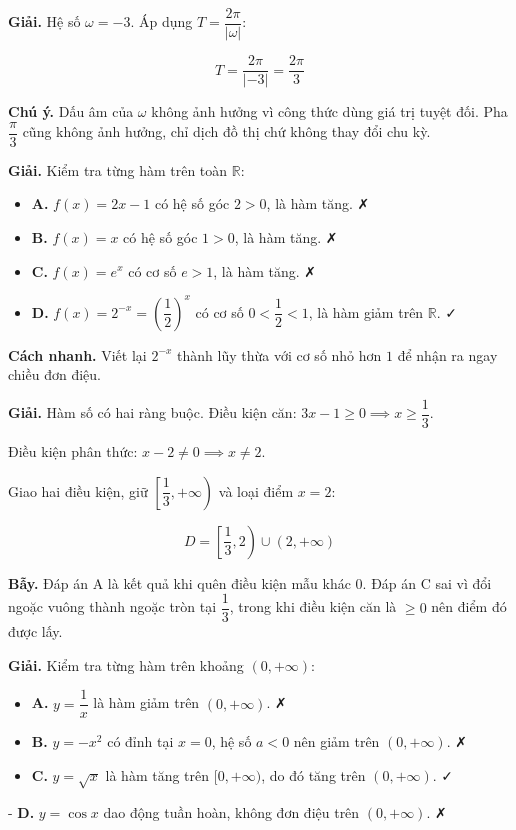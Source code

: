 \documentclass[11pt, a4paper]{article}
\begin{document}
\begin{dapan}[12 — Đáp án B]
\textbf{Giải.} Hệ số $\omega = -3$. Áp dụng $T = \dfrac{2\pi}{|\omega|}$:

$$T = \frac{2\pi}{|-3|} = \frac{2\pi}{3}$$

\textbf{Chú ý.} Dấu âm của $\omega$ không ảnh hưởng vì công thức dùng giá trị tuyệt đối. Pha $\dfrac{\pi}{3}$ cũng không ảnh hưởng, chỉ dịch đồ thị chứ không thay đổi chu kỳ.
\end{dapan}

\begin{dapan}[13 — Đáp án D]
\textbf{Giải.} Kiểm tra từng hàm trên toàn $\mathbb{R}$:

\begin{itemize}[leftmargin=1.4em, itemsep=2pt]
\item \textbf{A.} $f(x) = 2x - 1$ có hệ số góc $2 > 0$, là hàm tăng. ✗
\item \textbf{B.} $f(x) = x$ có hệ số góc $1 > 0$, là hàm tăng. ✗
\item \textbf{C.} $f(x) = e^x$ có cơ số $e > 1$, là hàm tăng. ✗
\item \textbf{D.} $f(x) = 2^{-x} = \left(\dfrac{1}{2}\right)^x$ có cơ số $0 < \dfrac{1}{2} < 1$, là hàm giảm trên $\mathbb{R}$. ✓
\end{itemize}


\textbf{Cách nhanh.} Viết lại $2^{-x}$ thành lũy thừa với cơ số nhỏ hơn $1$ để nhận ra ngay chiều đơn điệu.
\end{dapan}

\begin{dapan}[14 — Đáp án D]
\textbf{Giải.} Hàm số có hai ràng buộc. Điều kiện căn: $3x - 1 \ge 0 \implies x \ge \dfrac{1}{3}$.

Điều kiện phân thức: $x - 2 \neq 0 \implies x \neq 2$.

Giao hai điều kiện, giữ $\left[\dfrac{1}{3}, +\infty\right)$ và loại điểm $x = 2$:

$$D = \left[\dfrac{1}{3}, 2\right) \cup (2, +\infty)$$

\textbf{Bẫy.} Đáp án A là kết quả khi quên điều kiện mẫu khác $0$. Đáp án C sai vì đổi ngoặc vuông thành ngoặc tròn tại $\dfrac{1}{3}$, trong khi điều kiện căn là $\ge 0$ nên điểm đó được lấy.
\end{dapan}

\begin{dapan}[15 — Đáp án C]
\textbf{Giải.} Kiểm tra từng hàm trên khoảng $(0, +\infty)$:

\begin{itemize}[leftmargin=1.4em, itemsep=2pt]
\item \textbf{A.} $y = \dfrac{1}{x}$ là hàm giảm trên $(0, +\infty)$. ✗
\item \textbf{B.} $y = -x^2$ có đỉnh tại $x = 0$, hệ số $a < 0$ nên giảm trên $(0, +\infty)$. ✗
\item \textbf{C.} $y = \sqrt{x}$ là hàm tăng trên $[0, +\infty)$, do đó tăng trên $(0, +\infty)$. ✓
\end{itemize}

- \textbf{D.} $y = \cos x$ dao động tuần hoàn, không đơn điệu trên $(0, +\infty)$. ✗
\end{dapan}
\end{document}
